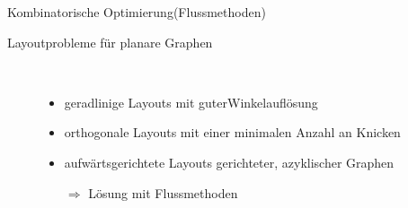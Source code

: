 \begin{TOPbreak}{Kombinatorische Optimierung}{(Flussmethoden)}
\vspace*{-1.5\baselineskip}
\begin{description}
	\item[Layoutprobleme für planare Graphen]\ \\\vspace*{-\baselineskip}
	\begin{itemize}[itemsep=-1pt]
			\item geradlinige Layouts mit \glqq guter\grqq Winkelauflösung
			\item orthogonale Layouts mit einer minimalen Anzahl an Knicken
			\item aufwärtsgerichtete Layouts gerichteter, azyklischer Graphen
			\item[$\Rightarrow$] Lösung mit Flussmethoden
		\end{itemize}
\end{description}
	\topbreak
\end{TOPbreak}
